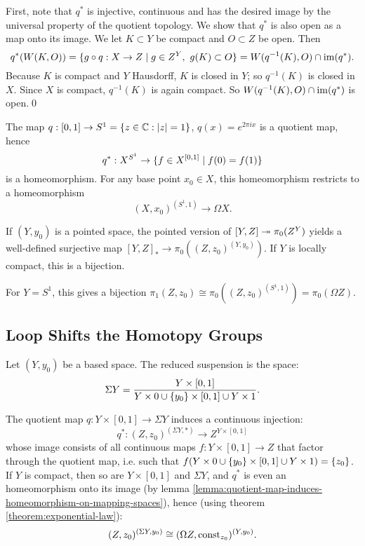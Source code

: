 

First, note that $q^*$ is injective, continuous and has the desired image by the universal property of the quotient topology. We show that $q^*$ is also open as a map onto its image. We let $K\subset Y$ be compact and $O\subset Z$ be open. Then
\[q^*(W(K,O))=\{g\circ q:X\to Z\mid g\in Z^Y,\ g(K)\subset O\}=W(q^{-1}(K),O)\cap\operatorname{im}(q^*).\]
Because $K$ is compact and $Y$ Hausdorff, $K$ is closed in $Y$; so $q^{-1}(K)$ is closed in $X$. Since $X$ is compact, $q^{-1}(K)$ is again compact. So $W(q^{-1}(K),O)\cap\operatorname{im}(q^*)$ is open.\qed

\begin{example}
The map $q:[0,1]\to S^1=\{z\in\mathbb{C}:|z|=1\}$, $q(x)=e^{2\pi ix}$ is a quotient map, hence
\[q^*:X^{S^1}\to\{f\in X^{[0,1]}\mid f(0)=f(1)\}\]
is a homeomorphism. For any base point $x_0\in X$, this homeomorphism restricts to a homeomorphism
\[(X,x_0)^{(S^1,1)}\to\Omega X.\]

If $(Y,y_0)$ is a pointed space, the pointed version of $[Y,Z]\twoheadrightarrow\pi_0(Z^Y)$ yields a well-defined surjective map $[Y,Z]_*\to\pi_0((Z,z_0)^{(Y,y_0)})$. If $Y$ is locally compact, this is a bijection.

For $Y=S^1$, this gives a bijection $\pi_1(Z,z_0)\cong\pi_0((Z,z_0)^{(S^1,1)})=\pi_0(\Omega Z)$.
\end{example}

\subsection{Loop Shifts the Homotopy Groups}

Let $(Y,y_0)$ be a based space. The reduced suspension is the space:
\[\Sigma Y=\frac{Y\times[0,1]}{Y\times 0\cup\{y_0\}\times[0,1]\cup Y\times 1}.\]

The quotient map $q:Y\times[0,1]\to\Sigma Y$ induces a continuous injection:
\[q^*:(Z,z_0)^{(\Sigma Y,*)}\to Z^{Y\times[0,1]}\]
whose image consists of all continuous maps $f:Y\times[0,1]\to Z$ that factor through the quotient map, i.e. such that $f(Y\times 0\cup\{y_0\}\times[0,1]\cup Y\times 1)=\{z_0\}$. If $Y$ is compact, then so are $Y\times[0,1]$ and $\Sigma Y$, and $q^*$ is even an homeomorphism onto its image (by lemma \ref{lemma:quotient-map-induces-homeomorphism-on-mapping-spaces}), hence (using theorem \ref{theorem:exponential-law}):
\[(Z,z_0)^{(\Sigma Y,y_0)}\cong(\Omega Z,\operatorname{const}_{z_0})^{(Y,y_0)}.\]

